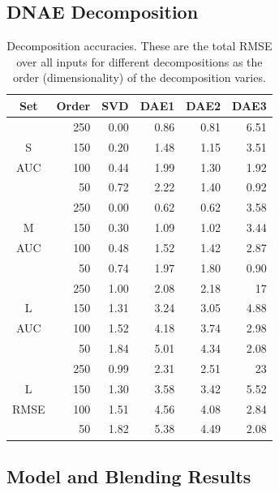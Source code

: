 \documentclass{article}
\begin{document}
\subsection{DNAE Decomposition}

\begin{table}[t]
\caption{Decomposition accuracies.  These are the total RMSE over all inputs for different decompositions as the order (dimensionality) of the decomposition varies.}
\label{table:sv-distributions}
\vskip 0.15in
\begin{center}
\begin{small}
\begin{sc}
\begin{tabular}{crrrrr}
\hline
\abovespace\belowspace
Set & Order & SVD & DAE1 & DAE2 & DAE3 \\
\hline
\abovespace
     & 250 & 0.00 & 0.86 & 0.81 & 6.51 \\
S    & 150 & 0.20 & 1.48 & 1.15 & 3.51 \\
AUC  & 100 & 0.44 & 1.99 & 1.30 & 1.92 \\
     &  50 & 0.72 & 2.22 & 1.40 & 0.92 \\
\abovespace
     & 250 & 0.00 & 0.62 & 0.62 & 3.58 \\
M    & 150 & 0.30 & 1.09 & 1.02 & 3.44 \\
AUC  & 100 & 0.48 & 1.52 & 1.42 & 2.87 \\
     &  50 & 0.74 & 1.97 & 1.80 & 0.90 \\
\abovespace
     & 250 & 1.00 & 2.08 & 2.18 & 17 \\
L    & 150 & 1.31 & 3.24 & 3.05 & 4.88 \\
AUC  & 100 & 1.52 & 4.18 & 3.74 & 2.98 \\
     &  50 & 1.84 & 5.01 & 4.34 & 2.08 \\
\abovespace
     & 250 & 0.99 & 2.31 & 2.51 & 23 \\
L    & 150 & 1.30 & 3.58 & 3.42 & 5.52 \\
RMSE & 100 & 1.51 & 4.56 & 4.08 & 2.84 \\
\belowspace
     &  50 & 1.82 & 5.38 & 4.49 & 2.08 \\
\hline
\end{tabular}
\end{sc}
\end{small}
\end{center}
\vskip -0.1in
\end{table}


\subsection{Model and Blending Results}
\end{document}
